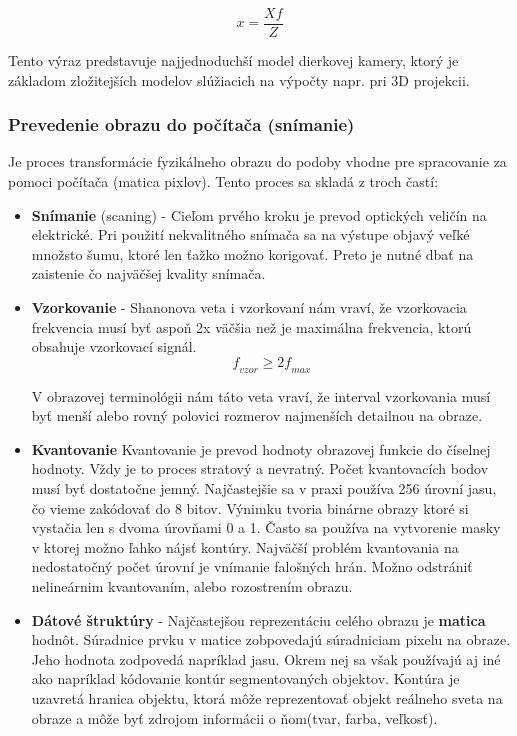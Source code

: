 $$\textit{x}=\frac{X\textit{f}}{Z}$$

Tento výraz predstavuje najjednoduchší model dierkovej kamery, ktorý je základom zložitejších modelov slúžiacich na výpočty napr. pri 3D projekcii. 

\subsubsection{Prevedenie obrazu do počítača (snímanie)}
Je proces transformácie fyzikálneho obrazu do podoby vhodne pre spracovanie za pomoci počítača (matica pixlov). Tento proces sa skladá z troch častí: 
\begin{itemize}
\item \textbf{Snímanie} (scaning) - Cieľom prvého kroku je prevod optických veličín na elektrické. Pri použití nekvalitného snímača sa na výstupe objavý veľké množsto šumu, ktoré len ťažko možno korigovať. Preto je nutné dbať na zaistenie čo najväčšej kvality snímača. 

\item \textbf{Vzorkovanie} - Shanonova veta i vzorkovaní nám vraví, že vzorkovacia frekvencia musí byť aspoň 2x väčšia než je maximálna frekvencia, ktorú obsahuje vzorkovací signál.
$$\textit{f}_{\textit{vzor}} \ge {2} \textit{f}_{\textit{max}}$$

V obrazovej terminológii nám táto veta vraví, že interval vzorkovania musí byť menší alebo rovný polovici rozmerov najmenších detailnou na obraze. 

\item \textbf{Kvantovanie} 
Kvantovanie je prevod hodnoty obrazovej funkcie do číselnej hodnoty. Vždy je to proces stratový a nevratný. Počet kvantovacích bodov musí byť dostatočne jemný. Najčastejšie sa v praxi používa 256 úrovní jasu, čo vieme zakódovať do 8 bitov. Výnimku tvoria binárne obrazy ktoré si vystačia len s dvoma úrovňami 0 a 1. Často sa používa na vytvorenie masky v ktorej možno ľahko nájsť kontúry. Najväčší problém kvantovania na nedostatočný počet úrovní je vnímanie falošných hrán. Možno odstrániť nelineárnim kvantovaním, alebo rozostrením obrazu. 



\item \textbf{Dátové štruktúry} - Najčastejšou reprezentáciu celého obrazu je \textbf{matica} hodnôt. Súradnice prvku v matice zobpovedajú súradniciam pixelu na obraze. Jeho hodnota zodpovedá napríklad jasu.  Okrem nej sa však používajú aj iné ako napríklad kódovanie kontúr segmentovaných objektov. Kontúra je uzavretá hranica objektu, ktorá môže reprezentovať objekt reálneho sveta na obraze a môže byť zdrojom informácii o ňom(tvar, farba, veľkosť).


\end{itemize}
